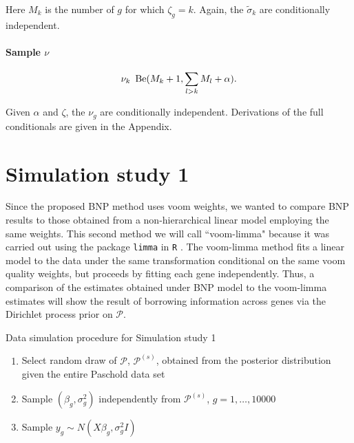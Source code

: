 \begin{itemize}
    Here $M_k$ is the number of $g$ for which $\zeta_g = k$. Again, the $\tilde{\sigma}_k$ are conditionally independent.

\paragraph{Sample $\nu$}
\begin{equation*}
\nu_k ~ \operatorname{Be}(M_k + 1, \sum_{l>k}M_l + \alpha).
\end{equation*}

Given $\alpha$ and $\zeta$, the $\nu_g$ are conditionally independent. Derivations of the full conditionals are given in the Appendix.

\section{Simulation study 1}
\label{sec:ss1}
Since the proposed BNP method uses voom weights, we wanted to compare BNP results to those obtained from a non-hierarchical linear model employing the same weights. This second method we will call ``voom-limma" because it was carried out using the package \texttt{limma} in \texttt{R} \citep{smyth2005limma}. The voom-limma method fits a linear model to the data under the same transformation conditional on the same voom quality weights, but proceeds by fitting each gene independently. Thus, a comparison of the estimates obtained under BNP model to the voom-limma estimates will show the result of borrowing information across genes via the Dirichlet process prior on $\mathcal{P}$.

\begin{table}
\caption{Data simulation procedure for Simulation study 1}
\begin{enumerate}
\item Select random draw of $\mathcal{P}$, $\mathcal{P}^{(s)}$, obtained from the posterior distribution given the entire Paschold data set
\item Sample $(\beta_g,\sigma^2_g)$ independently from $\mathcal{P}^{(s)}$, $g=1,\ldots,10000$
\item Sample $y_{g} \sim N(X\beta_g,\sigma^2_g I)$
\end{enumerate}
\end{table}


\end{itemize}
